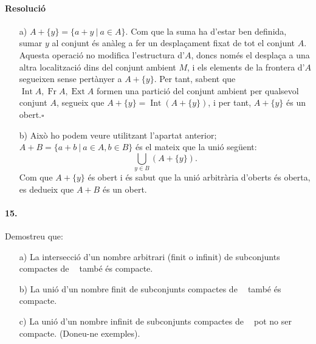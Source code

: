 \documentclass[11pt]{article}
\DeclareMathOperator{\Rn}{\mathbb{R}^n}
\DeclareMathOperator{\fr}{Fr}
\DeclareMathOperator{\intr}{Int}
\DeclareMathOperator{\ext}{Ext}
\begin{document}
\paragraph{Resolució}
\begin{itemize}
	\item[a)] $A+\{y\}=\{a+y\ \vert\ a\in A\}$. Com que la suma ha d'estar ben definida, sumar $y$ al conjunt és anàleg a fer un desplaçament fixat de tot el conjunt $A$. Aquesta operació no modifica l'estructura d'$A$, doncs només el desplaça a una altra localització dins del conjunt ambient $M$, i els elements de la frontera d'$A$ segueixen sense pertànyer a $A+\{y\}$. Per tant, sabent que $\intr A,\fr A,\ext A$ formen una partició del conjunt ambient per qualsevol conjunt $A$, segueix que $A+\{y\}=\intr(A+\{y\})$, i per tant, $A+\{y\}$ és un obert.$\square$
	\item[b)] Això ho podem veure utilitzant l'apartat anterior; $A+B=\{a+b\ \vert\ a\in A,b\in B\}$ és el mateix que la unió següent:
	$$
	\bigcup_{y\in B}(A+\{y\}).
	$$
	Com que $A+\{y\}$ és obert i és sabut que la unió arbitrària d'oberts és oberta, es dedueix que $A+B$ és un obert.
\end{itemize}
\paragraph{15.} Demostreu que:
\begin{itemize}
	\item[a)] La intersecció d'un nombre arbitrari (finit o infinit) de subconjunts compactes de $\Rn$ també és compacte.
	\item[b)] La unió d'un nombre finit de subconjunts compactes de $\Rn$ també és compacte.
	\item[c)] La unió d'un nombre infinit de subconjunts compactes de $\Rn$ pot no ser compacte. (Doneu-ne exemples).
\end{itemize}
\end{document}
